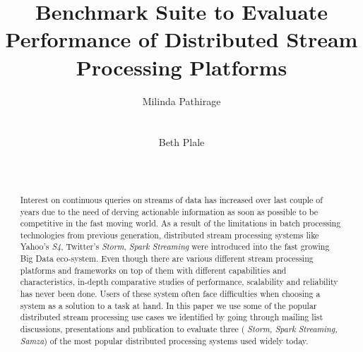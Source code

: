 \documentclass{sig-alternate}
\begin{document}
%

\title{Benchmark Suite to Evaluate Performance of Distributed Stream
  Processing Platforms}


\author{
\alignauthor
Milinda Pathirage\\
       \\
       \\
\alignauthor
Beth Plale\\
       \\
       \\
}

\maketitle
\begin{abstract}
  Interest on continuous queries on streams of data has increased over last couple of years due to
  the need of derving actionable information as soon as possible
 to be competitive in the fast moving world. As a result of the limitations
 in batch processing technologies from previous generation, distributed
 stream processing systems like Yahoo's \textit{S4}, Twitter's \textit{Storm}, \textit{Spark
 Streaming} were introduced into the fast growing Big Data eco-system.
 Even though there are various different stream processing platforms
 and frameworks on top of them with different capabilities and
 characteristics, in-depth comparative studies of performance, scalability and
 reliability has never been done. Users of these system often face
 difficulties when choosing a system as a solution to a task at hand.
 In this paper we use some of the popular distributed stream
 processing use cases we identified by going through mailing list
 discussions, presentations and publication to evaluate three (
 \textit{Storm, Spark Streaming, Samza}) of the
 most popular distributed processing systems used widely today.
\end{abstract}
\end{document}
